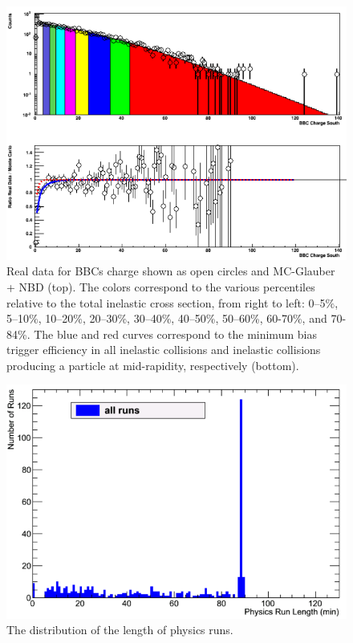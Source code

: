 \begin{figure}[!h]
\begin{center}
\includegraphics[width=0.65\linewidth]{figs/centrality_determination.png}
\caption{Real data for BBCs charge shown as open circles and MC-Glauber + NBD (top). The colors correspond to the various percentiles relative to the total inelastic \pau cross section, from right to left: 0--5$\%$, 5--10\%, 10--20\%, 20--30\%, 30--40\%, 40--50\%, 50--60\%, 60-70\%, and 70-84\%. The blue and red curves correspond to the minimum bias trigger efficiency in all inelastic collisions and inelastic collisions producing a particle at mid-rapidity, respectively (bottom).}
\label{fig:cent_determination_plot}
\end{center}
\end{figure}


\iffalse

\begin{figure}[!h]
\begin{center}
\includegraphics[width=0.65\linewidth]{figs/hruntime.png}
\caption{The distribution of the length of physics runs.}
\end{center}
\end{figure}

